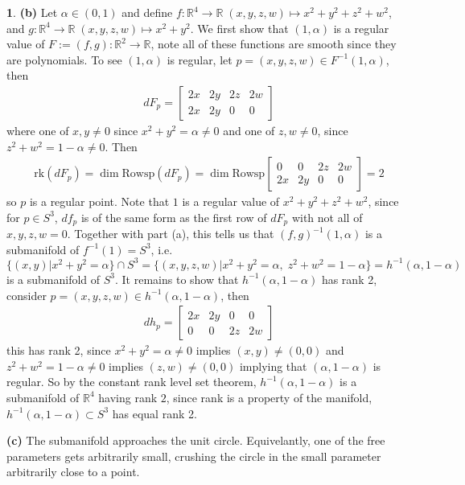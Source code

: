 \documentclass[10.5pt]{article}
\theoremstyle{definition}
\newtheorem{pb}{}
\newcommand{\set}[1]{\{#1\}}
\begin{document}
\begin{pb}
        \textbf{(b)} Let \(\alpha \in (0,1)\) and define \(f: \mathbb{R}^4 \to \mathbb{R} \; (x,y,z,w) \mapsto x^2 + y^2 + z^2 + w^2\), and \(g: \mathbb{R}^4 \to \mathbb{R} \; (x,y,z,w) \mapsto x^2 + y^2\).
        We first show that \((1,\alpha)\) is a regular value of \(F := (f,g): \mathbb{R}^2 \to \mathbb{R}\), note all of these functions are smooth since they are polynomials. 
        To see \((1,\alpha)\) is regular, let \(p = (x,y,z,w) \in F^{-1}(1,\alpha)\), then
        \begin{align*}
            dF_p = \begin{bmatrix} 2x & 2y & 2z & 2w \\ 2x & 2y & 0 & 0 \end{bmatrix}
        \end{align*}
        where one of \(x,y \neq 0\) since \(x^2 + y^2 = \alpha \neq 0\) and one of \(z,w \neq 0\), since \(z^2 + w^2 = 1-\alpha \neq 0\). Then
        \begin{align*}
            \text{rk}(dF_p) = \dim\text{Rowsp}(dF_p) = \dim\text{Rowsp} \begin{bmatrix} 0 & 0 & 2z & 2w \\ 2x & 2y & 0 & 0\end{bmatrix} = 2
        \end{align*}
        so \(p\) is a regular point. Note that \(1\) is a regular value of \(x^2 + y^2 + z^2 + w^2\), since for \(p \in S^3\), \(df_p\) is of the same form as the first row of \(dF_p\)
        with not all of \(x,y,z,w = 0\).
        Together with part (a), this tells us that \((f,g)^{-1}(1,\alpha)\) is a submanifold of \(f^{-1}(1) = S^3\), i.e.
        \[\set{(x,y) \vert x^2 + y^2 = \alpha} \cap S^3 = \set{(x,y,z,w) \vert x^2 + y^2 = \alpha, \; z^2 + w^2 = 1 - \alpha} = h^{-1}(\alpha,1-\alpha)\]
        is a submanifold of \(S^3\). It remains to show that \(h^{-1}(\alpha,1-\alpha)\) has rank 2, consider \(p = (x,y,z,w) \in h^{-1}(\alpha,1-\alpha)\), then
        \begin{align*}
            dh_p = \begin{bmatrix} 2x & 2y & 0 & 0 \\ 0 & 0 & 2z & 2w \end{bmatrix}
        \end{align*}
        this has rank 2, since \(x^2 + y^2 = \alpha \neq 0\) implies \((x,y) \neq (0,0)\) and \(z^2 + w^2 = 1-\alpha \neq 0\) implies \((z,w) \neq (0,0)\) implying that \((\alpha,1-\alpha)\) is regular.
        So by the constant rank level set theorem, \(h^{-1}(\alpha,1-\alpha)\) is a submanifold of \(\mathbb{R}^4\) having rank \(2\), since rank is a property of the manifold, \(h^{-1}(\alpha,1-\alpha) \subset S^3\)
        has equal rank 2.

        \textbf{(c)} The submanifold approaches the unit circle. Equivelantly, one of the free parameters gets arbitrarily small, crushing the circle in the small parameter
        arbitrarily close to a point.

    \end{pb}
\end{document}
